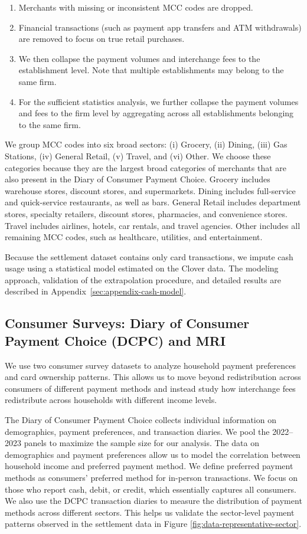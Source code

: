 \documentclass[main.tex]{subfiles}
\begin{document}
\begin{enumerate}
    \item Merchants with missing or inconsistent MCC codes are dropped.
    \item Financial transactions (such as payment app transfers and ATM withdrawals) are removed to focus on true retail purchases.
    \item We then collapse the payment volumes and interchange fees to the establishment level. Note that multiple establishments may belong to the same firm.
    \item For the sufficient statistics analysis, we further collapse the payment volumes and fees to the firm level by aggregating across all establishments belonging to the same firm.
\end{enumerate}

We group MCC codes into six broad sectors: (i) Grocery, (ii) Dining, (iii) Gas Stations, (iv) General Retail, (v) Travel, and (vi) Other.
We choose these categories because they are the largest broad categories of merchants that are also present in the Diary of Consumer Payment Choice.
Grocery includes warehouse stores, discount stores, and supermarkets.
Dining includes full-service and quick-service restaurants, as well as bars.
General Retail includes department stores, specialty retailers, discount stores, pharmacies, and convenience stores.
Travel includes airlines, hotels, car rentals, and travel agencies.
Other includes all remaining MCC codes, such as healthcare, utilities, and entertainment.

Because the settlement dataset contains only card transactions, we impute cash usage using a statistical model estimated on the Clover data.
The modeling approach, validation of the extrapolation procedure, and detailed results are described in Appendix~\ref{sec:appendix-cash-model}.

\subsection{Consumer Surveys: Diary of Consumer Payment Choice (DCPC) and MRI}

We use two consumer survey datasets to analyze household payment preferences and card ownership patterns.
This allows us to move beyond redistribution across consumers of different payment methods and instead study how interchange fees redistribute across households with different income levels.

The Diary of Consumer Payment Choice collects individual information on demographics, payment preferences, and transaction diaries.
We pool the 2022--2023 panels to maximize the sample size for our analysis.
The data on demographics and payment preferences allow us to model the correlation between household income and preferred payment method.
We define preferred payment methods as consumers' preferred method for in-person transactions.
We focus on those who report cash, debit, or credit, which essentially captures all consumers.
We also use the DCPC transaction diaries to measure the distribution of payment methods across different sectors.
This helps us validate the sector-level payment patterns observed in the settlement data in Figure \ref{fig:data-representative-sector}.
\end{document}
